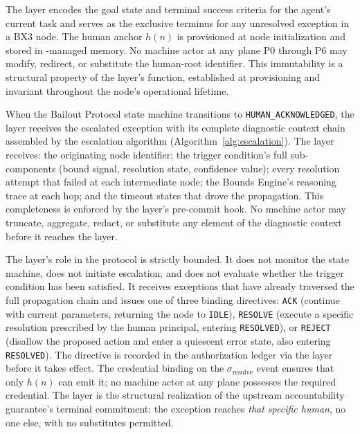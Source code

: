 The \purposeLayer{} layer encodes the goal state and terminal success criteria for
the agent's current task and serves as the exclusive terminus for any
unresolved exception in a BX3 node.  The human anchor $h(n)$ is provisioned
at node initialization and stored in \factLayer{}-managed memory.  No machine
actor at any plane P0 through P6 may modify, redirect, or substitute the
human-root identifier.  This immutability is a structural property of the
\purposeLayer{} layer's function, established at provisioning and invariant
throughout the node's operational lifetime.

When the Bailout Protocol state machine transitions to
\texttt{HUMAN\_ACKNOWLEDGED}, the \purposeLayer{} layer receives the escalated
exception with its complete diagnostic context chain assembled by the
escalation algorithm (Algorithm~\ref{alg:escalation}).  The layer receives:
the originating node identifier; the trigger condition's full sub-components
(bound signal, resolution state, confidence value); every resolution attempt
that failed at each intermediate node; the Bounds Engine's reasoning trace at
each hop; and the timeout states that drove the propagation.  This
completeness is enforced by the \factLayer{} layer's pre-commit hook.  No machine
actor may truncate, aggregate, redact, or substitute any element of the
diagnostic context before it reaches the \purposeLayer{} layer.

The \purposeLayer{} layer's role in the protocol is strictly bounded.  It does not
monitor the state machine, does not initiate escalation, and does not
evaluate whether the trigger condition has been satisfied.  It receives
exceptions that have already traversed the full propagation chain and issues
one of three binding directives: \texttt{ACK} (continue with current
parameters, returning the node to \texttt{IDLE}), \texttt{RESOLVE} (execute
a specific resolution prescribed by the human principal, entering
\texttt{RESOLVED}), or \texttt{REJECT} (disallow the proposed action and
enter a quiescent error state, also entering \texttt{RESOLVED}).  The
directive is recorded in the authorization ledger via the \factLayer{} layer before
it takes effect.  The credential binding on the $\sigma_{\text{resolve}}$
event ensures that only $h(n)$ can emit it; no machine actor at any plane
possesses the required credential.  The \purposeLayer{} layer is the structural
realization of the upstream accountability guarantee's terminal commitment:
the exception reaches \emph{that specific human}, no one else, with no
substitutes permitted.

